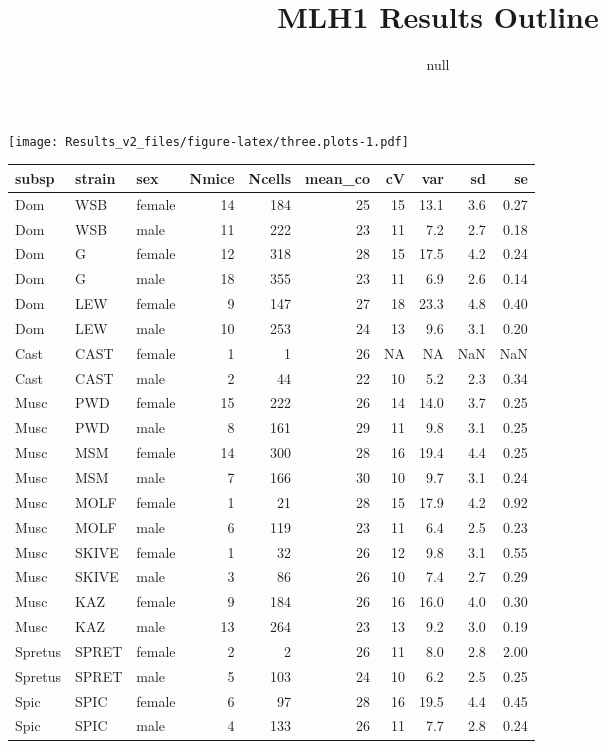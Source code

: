 \documentclass[]{article}
\title{MLH1 Results Outline}
\author{}
\date{null}
\begin{document}
\maketitle

\texttt{[image: Results\_v2\_files/figure-latex/three.plots-1.pdf]}

\begin{tabular}{l|l|l|r|r|r|r|r|r|r}
\hline
subsp & strain & sex & Nmice & Ncells & mean\_co & cV & var & sd & se\\
\hline
Dom & WSB & female & 14 & 184 & 25 & 15 & 13.1 & 3.6 & 0.27\\
\hline
Dom & WSB & male & 11 & 222 & 23 & 11 & 7.2 & 2.7 & 0.18\\
\hline
Dom & G & female & 12 & 318 & 28 & 15 & 17.5 & 4.2 & 0.24\\
\hline
Dom & G & male & 18 & 355 & 23 & 11 & 6.9 & 2.6 & 0.14\\
\hline
Dom & LEW & female & 9 & 147 & 27 & 18 & 23.3 & 4.8 & 0.40\\
\hline
Dom & LEW & male & 10 & 253 & 24 & 13 & 9.6 & 3.1 & 0.20\\
\hline
Cast & CAST & female & 1 & 1 & 26 & NA & NA & NaN & NaN\\
\hline
Cast & CAST & male & 2 & 44 & 22 & 10 & 5.2 & 2.3 & 0.34\\
\hline
Musc & PWD & female & 15 & 222 & 26 & 14 & 14.0 & 3.7 & 0.25\\
\hline
Musc & PWD & male & 8 & 161 & 29 & 11 & 9.8 & 3.1 & 0.25\\
\hline
Musc & MSM & female & 14 & 300 & 28 & 16 & 19.4 & 4.4 & 0.25\\
\hline
Musc & MSM & male & 7 & 166 & 30 & 10 & 9.7 & 3.1 & 0.24\\
\hline
Musc & MOLF & female & 1 & 21 & 28 & 15 & 17.9 & 4.2 & 0.92\\
\hline
Musc & MOLF & male & 6 & 119 & 23 & 11 & 6.4 & 2.5 & 0.23\\
\hline
Musc & SKIVE & female & 1 & 32 & 26 & 12 & 9.8 & 3.1 & 0.55\\
\hline
Musc & SKIVE & male & 3 & 86 & 26 & 10 & 7.4 & 2.7 & 0.29\\
\hline
Musc & KAZ & female & 9 & 184 & 26 & 16 & 16.0 & 4.0 & 0.30\\
\hline
Musc & KAZ & male & 13 & 264 & 23 & 13 & 9.2 & 3.0 & 0.19\\
\hline
Spretus & SPRET & female & 2 & 2 & 26 & 11 & 8.0 & 2.8 & 2.00\\
\hline
Spretus & SPRET & male & 5 & 103 & 24 & 10 & 6.2 & 2.5 & 0.25\\
\hline
Spic & SPIC & female & 6 & 97 & 28 & 16 & 19.5 & 4.4 & 0.45\\
\hline
Spic & SPIC & male & 4 & 133 & 26 & 11 & 7.7 & 2.8 & 0.24\\
\hline
\end{tabular}
\end{document}
